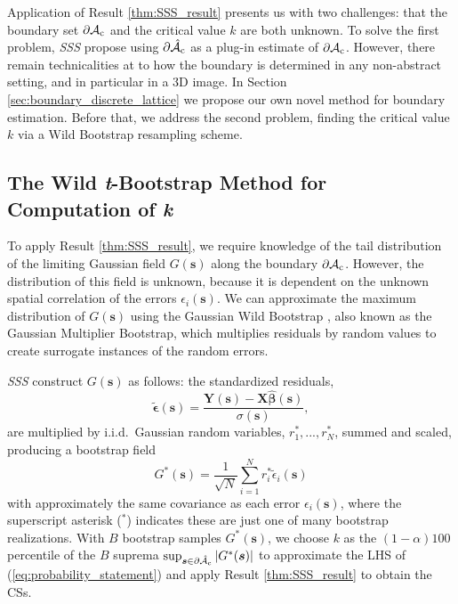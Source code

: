 Application of Result \ref{thm:SSS_result} presents us with two challenges: that the boundary set $\operatorname{\partial\mathcal{A}_{c}}$ and the critical value $k$ are both unknown.  To solve the first problem, \textit{SSS} propose using $\operatorname{\partial\hat{\mathcal{A}}_{c}}$ as a plug-in estimate of $\operatorname{\partial\mathcal{A}_{c}}$. However, there remain technicalities at to how the boundary is determined in any non-abstract setting, and in particular in a 3D image. In Section \ref{sec:boundary_discrete_lattice} we propose our own novel method for boundary estimation. Before that, we address the second problem, finding the critical value $k$ via a Wild Bootstrap resampling scheme. 

\subsection{The Wild \textit{t}-Bootstrap Method for Computation of \textit{k}}
\label{sec:wild_bootstrap}
To apply Result \ref{thm:SSS_result}, we require knowledge of the tail distribution of the limiting Gaussian field $G(\bm{s})$ along the boundary $\operatorname{\partial\mathcal{A}_{c}}$. However, the distribution of this field is unknown, because it is dependent on the unknown spatial correlation of the errors $\epsilon_i(\bm{s})$. We can approximate the maximum distribution of $G(\bm{s})$ using the Gaussian Wild Bootstrap \citep{Chernozhukov2013-wz}, also known as the Gaussian Multiplier Bootstrap, which multiplies residuals by random values to create surrogate instances of the random errors.

\textit{SSS} construct $G(\bm{s})$ as follows: the standardized residuals,
\begin{equation}
\label{eq:SSS_standardized_residuals}
\tilde{\bm{\epsilon}}(\bm{s}) = \frac{ \bm{Y}(\bm{s}) - \bm{X}\hat{\bm{\beta}}(\bm{s})}{\sigma(\bm{s})},
\end{equation}
%
are  multiplied by i.i.d.~Gaussian random variables, $r^*_1,...,r^*_N$,  summed and scaled, producing a bootstrap field
\begin{equation}
\label{eq:SSS_residual_field}
G^*(\bm{s}) = \frac{1}{\sqrt{N}}\sum_{i=1}^{N} r^*_i\tilde{\epsilon}_{i}(\bm{s})
\end{equation}
with approximately the same covariance as each error $\epsilon_i(\bm{s})$, where the superscript asterisk ($^{*}$) indicates these are just one of many bootstrap realizations. With $B$ bootstrap samples $G^*(\bm{s})$, we choose $k$ as the $(1 - \alpha)100$ percentile of the $B$ suprema $\sup_{\bm{s}\in\operatorname{\partial\hat{\mathcal{A}}_{c}}}|G^*(\bm{s})|$ to approximate the LHS of (\ref{eq:probability_statement}) and apply Result \ref{thm:SSS_result} to obtain the CSs. 

